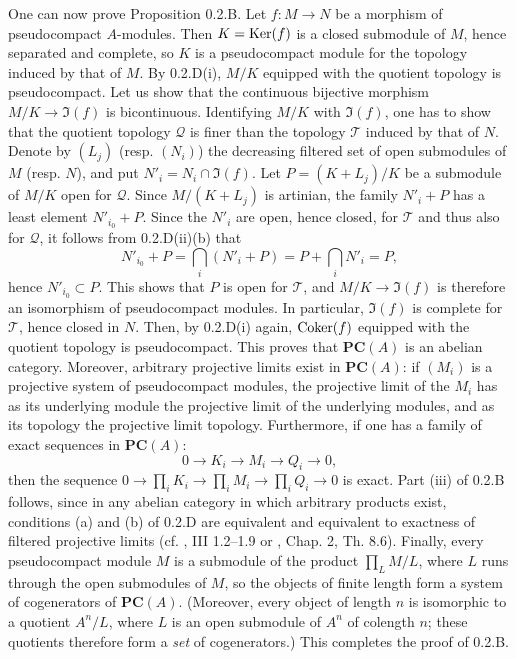 One can now prove Proposition 0.2.B. Let $f:M\to N$ be a morphism of pseudocompact $A$-modules. Then $K=\operatorname{Ker}(f)$ is a closed submodule of $M$, hence separated and complete, so $K$ is a pseudocompact module for the topology induced by that of $M$. By 0.2.D(i), $M/K$ equipped with the quotient topology is pseudocompact.
Let us show that the continuous bijective morphism $M/K\to\Im(f)$ is bicontinuous. Identifying $M/K$ with $\Im(f)$, one has to show that the quotient topology $\mathcal Q$ is finer than the topology $\mathcal T$ induced by that of $N$.
Denote by $(L_j)$ (resp. $(N_i)$) the decreasing filtered set of open submodules of $M$ (resp. $N$), and put $N'_i=N_i\cap\Im(f)$. Let $P=(K+L_j)/K$ be a submodule of $M/K$ open for $\mathcal Q$. Since $M/(K+L_j)$ is artinian, the family $N'_i+P$ has a least element $N'_{i_0}+P$. Since the $N'_i$ are open, hence closed, for $\mathcal T$ and thus also for $\mathcal Q$, it follows from 0.2.D(ii)(b) that
\[
N'_{i_0}+P=\bigcap_i(N'_i+P)=P+\bigcap_i N'_i=P,
\]
hence $N'_{i_0}\subset P$. This shows that $P$ is open for $\mathcal T$, and $M/K\to\Im(f)$ is therefore an isomorphism of pseudocompact modules.
In particular, $\Im(f)$ is complete for $\mathcal T$, hence closed in $N$. Then, by 0.2.D(i) again, $\operatorname{Coker}(f)$ equipped with the quotient topology is pseudocompact. This proves that $\mathbf{PC}(A)$ is an abelian category.
Moreover, arbitrary projective limits exist in $\mathbf{PC}(A)$: if $(M_i)$ is a projective system of pseudocompact modules, the projective limit of the $M_i$ has as its underlying module the projective limit of the underlying modules, and as its topology the projective limit topology. Furthermore, if one has a family of exact sequences in $\mathbf{PC}(A)$:
\[
0\to K_i\to M_i\to Q_i\to0,
\]
then the sequence $0\to\prod_i K_i\to\prod_i M_i\to\prod_i Q_i\to0$ is exact. Part (iii) of 0.2.B follows, since in any abelian category in which arbitrary products exist, conditions (a) and (b) of 0.2.D are equivalent and equivalent to exactness of filtered projective limits (cf. \cite{Mi65}, III 1.2--1.9 or \cite{Po73}, Chap. 2, Th. 8.6).
Finally, every pseudocompact module $M$ is a submodule of the product $\prod_L M/L$, where $L$ runs through the open submodules of $M$, so the objects of finite length form a system of cogenerators of $\mathbf{PC}(A)$. (Moreover, every object of length $n$ is isomorphic to a quotient $A^n/L$, where $L$ is an open submodule of $A^n$ of colength $n$; these quotients therefore form a \emph{set} of cogenerators.) This completes the proof of 0.2.B.
